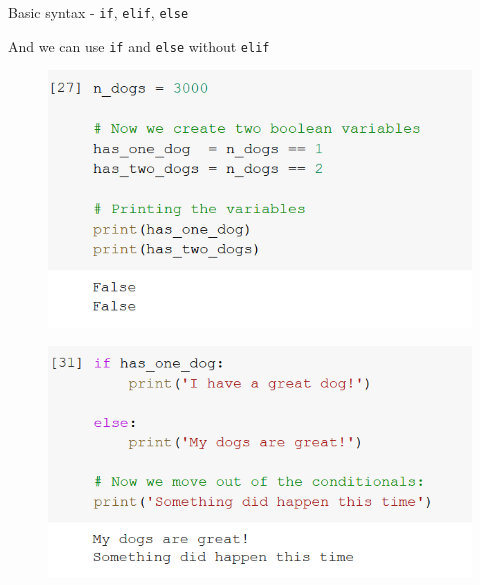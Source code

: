 \documentclass[aspectratio=169]{beamer}
\begin{document}
\begin{frame}{Basic syntax - \texttt{if}, \texttt{elif}, \texttt{else}}

	And we can use \texttt{if} and \texttt{else} without \texttt{elif}

	\begin{multicols}{2}

		\begin{figure}
			\centering
			\includegraphics[width=\linewidth]{img/boolean_variables.png}
		\end{figure}
		\begin{figure}
			\centering
			\includegraphics[width=\linewidth]{img/if_else.png}
		\end{figure}

	\end{multicols}

\end{frame}
\end{document}
